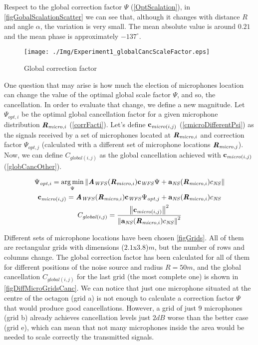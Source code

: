 Respect to the global correction factor $\Psi$ (\autoref{OptScalation}), in \autoref{figGobalScalationScatter} we can see that, although it changes with distance $R$ and angle $\alpha$, the variation is very small. The mean absolute value is around $0.21$ and the mean phase is approximately $-137^\circ$. 

\begin{figure}[H]
	\centering
	\texttt{[image: ./Img/Experiment1\_globalCancScaleFactor.eps]}
	\caption[Global correction factor]{Global correction factor}
	\label{figGobalScalationScatter}
\end{figure}

One question that may arise is how much the election of microphones location can change the value of the optimal global scale factor $\Psi$, and so, the cancellation. In order to evaluate that change, we define a new magnitude. Let $\Psi_{\mathit{opt}, i}$ be the optimal global cancellation factor for a given microphone distribution $\pos[matMicro]{,i}$ (\autoref{corrFacti}). Let's define $\cmicro[(i,j)]$ (\autoref{cmicroDifferentPsi}) as the signals received by a set of microphones located at $\pos[matMicro]{,i}$ and correction factor $\Psi_{\mathit{opt}, j}$ (calculated with a different set of microphone locations $\pos[matMicro]{,j}$). Now, we can define $C_{\mathit{global}(i,j)}$ as the global cancellation achieved with $\cmicro[(i,j)]$ (\autoref{globCancOther}).

\begin{gather}
\Psi_{\mathit{opt}, i} = \argmin_{\Psi} \norm{\Awfs(\pos[matMicro]{,i})\cwfs \Psi + \vec{a}_{\mathit{NS}}(\pos[matMicro]{,i}) \cnsScalar} \label{corrFacti} \\
\cmicro[(i,j)] = \Awfs(\pos[matMicro]{,i})\cwfs \Psi_{\mathit{opt}, j} + \vec{a}_{\mathit{NS}}(\pos[matMicro]{,i}) \cnsScalar \label{cmicroDifferentPsi} \\
C_{\mathit{global}(i,j)} = \frac{\norm{\cmicro[(i,j)]}^2}{\norm{\vec{a}_{\mathit{NS}}(\pos[matMicro]{,i}) \cnsScalar}^2} \label{globCancOther}
\end{gather}

Different sets of microphone locations have been chosen \autoref{figGrids}. All of them are rectangular grids with dimensions ($2.1$x$3.8$)$\si{m}$, but the number of rows and columns change. The global correction factor has been calculated for all of them for different positions of the noise source and radius $R = 50\si{m}$, and the global cancellation $C_{\mathit{global}(i,j)}$ for the last grid (the most complete one) is shown in \autoref{figDiffMicroGridsCanc}. We can notice that just one microphone situated at the centre of the octagon (grid a) is not enough to calculate a correction factor $\Psi$ that would produce good cancellations. However, a grid of just 9 microphones (grid b) already achieves cancellation levels just $2\si{dB}$ worse than the better case (grid e), which can mean that not many microphones inside the area would be needed to scale correctly the transmitted signals.

